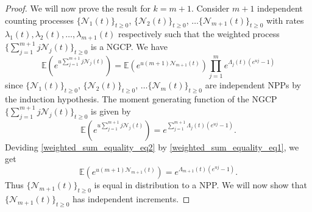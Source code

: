 \documentclass[11pt,oneside,reqno]{amsart}
\theoremstyle{definition}
\theoremstyle{remarkstyle}
\begin{document}
\begin{proof}
    We will now prove the result for $k=m+1$. Consider $m+1$ independent counting processes $\{\mathcal{N}_1(t)\}_{t\ge 0}$, $\{\mathcal{N}_2(t)\}_{t\ge 0}$, $\dots\{\mathcal{N}_{m+1}(t)\}_{t\ge 0}$ with rates $\lambda_1(t),\lambda_2(t),\dots,\lambda_{m+1}(t)$ respectively such that the weighted process $\{\sum_{j=1}^{m+1}j\mathcal{N}_j(t)\}_{t\ge 0}$ is a NGCP. We have
    \begin{equation}
        \mathbb{E}\left(e^{u\sum_{j=1}^{m+1}j\mathcal{N}_{j}(t)}\right)=\mathbb{E}\left(e^{u(m+1)\mathcal{N}_{m+1}(t)}\right)\prod_{j=1}^{m}e^{\Lambda_j(t)(e^{uj}-1)}\label{weighted_sum_equality_eq1}
    \end{equation}
    since $\{\mathcal{N}_1(t)\}_{t\ge 0}$, $\{\mathcal{N}_2(t)\}_{t\ge 0}$, $\dots\{\mathcal{N}_{m}(t)\}_{t\ge 0}$ are independent NPPs by the induction hypothesis. The moment generating function of the NGCP $\{\sum_{j=1}^{m+1}j\mathcal{N}_j(t)\}_{t\ge 0}$ is given by
    \begin{equation}
        \mathbb{E}\left(e^{u\sum_{j=1}^{m+1}j\mathcal{N}_{j}(t)}\right)=e^{\sum_{j=1}^{m+1}\Lambda_j(t)(e^{uj}-1)}.\label{weighted_sum_equality_eq2}
    \end{equation}
    Deviding \eqref{weighted_sum_equality_eq2} by \eqref{weighted_sum_equality_eq1}, we get
    \begin{equation*}
        \mathbb{E}\left(e^{u(m+1)\mathcal{N}_{m+1}(t)}\right)=e^{\Lambda_{m+1}(t)(e^{uj}-1)}.
    \end{equation*}
    Thus $\{\mathcal{N}_{m+1}(t)\}_{t\ge 0}$ is equal in distribution to a NPP. We will now show that $\{\mathcal{N}_{m+1}(t)\}_{t\ge 0}$ has independent increments.
    

\end{proof}
\end{document}
